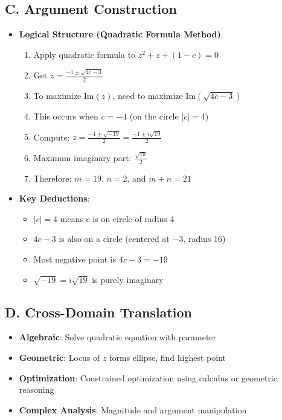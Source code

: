 \documentclass[11pt]{article}
\begin{document}
\begin{strategybox}
\subsection*{C. Argument Construction}
\begin{itemize}[leftmargin=*]
    \item \textbf{Logical Structure (Quadratic Formula Method)}:
    \begin{enumerate}
        \item Apply quadratic formula to $z^2 + z + (1-c) = 0$
        \item Get $z = \frac{-1 \pm \sqrt{4c-3}}{2}$
        \item To maximize $\text{Im}(z)$, need to maximize $\text{Im}(\sqrt{4c-3})$
        \item This occurs when $c = -4$ (on the circle $|c| = 4$)
        \item Compute: $z = \frac{-1 \pm \sqrt{-19}}{2} = \frac{-1 \pm i\sqrt{19}}{2}$
        \item Maximum imaginary part: $\frac{\sqrt{19}}{2}$
        \item Therefore: $m = 19$, $n = 2$, and $m + n = 21$
    \end{enumerate}
    \item \textbf{Key Deductions}:
    \begin{itemize}
        \item $|c| = 4$ means $c$ is on circle of radius 4
        \item $4c - 3$ is also on a circle (centered at $-3$, radius 16)
        \item Most negative point is $4c - 3 = -19$
        \item $\sqrt{-19} = i\sqrt{19}$ is purely imaginary
    \end{itemize}
\end{itemize}

\subsection*{D. Cross-Domain Translation}
\begin{itemize}[leftmargin=*]
    \item \textbf{Algebraic}: Solve quadratic equation with parameter
    \item \textbf{Geometric}: Locus of $z$ forms ellipse, find highest point
    \item \textbf{Optimization}: Constrained optimization using calculus or geometric reasoning
    \item \textbf{Complex Analysis}: Magnitude and argument manipulation
\end{itemize}
\end{strategybox}
\end{document}

